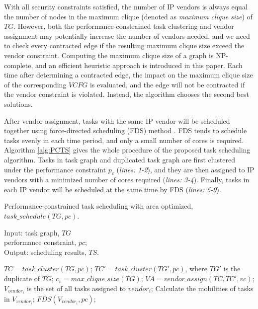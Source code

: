 \documentclass[10pt,journal]{IEEEtran}
\begin{document}
With all security constraints satisfied, the number of IP vendors is always equal the number of nodes in the maximum clique (denoted as \textit{maximum clique size}) of $TG$. However, both the performance-constrained task clustering and vendor assignment may potentially increase the number of vendors needed, and we need to check every contracted edge if the resulting maximum clique size exceed the vendor constraint. Computing the maximum clique size of a graph is NP-complete, and an efficient heuristic approach \cite{article:CL} is introduced in this paper. Each time after determining a contracted edge, the impact on the maximum clique size of the corresponding $VCFG$ is evaluated, and the edge will not be contracted if the vendor constraint is violated. Instead, the algorithm chooses the second best solutions.

After vendor assignment, tasks with the same IP vendor will be scheduled together using force-directed scheduling (FDS) method \cite{article:PP}. FDS tends to schedule tasks evenly in each time period, and only a small number of cores is required. Algorithm \ref{alg:PCTS} gives the whole procedure of the proposed task scheduling algorithm. Tasks in task graph and duplicated task graph are first clustered under the performance constraint $p_c$ (\textit{lines: 1-2}), and they are then assigned to IP vendors with a minimized number of cores required (\textit{lines: 3-4}). Finally, tasks in each IP vendor will be scheduled at the same time by FDS (\textit{lines: 5-9}).


\begin{algorithm}[!h]
\caption{Performance-constrained task scheduling with area optimized, $task\_schedule(TG, pc)$.}
\label{alg:PCTS}
{Input:} task graph, $TG$\\
\hspace*{2.8em}performance constraint, $pc$;\\
{Output:} scheduling results, $TS$.
\begin{algorithmic}[1]
\STATE $TC=task\_cluster(TG,pc)$;
\STATE $TC'=task\_cluster(TG',pc)$, where $TG'$ is the duplicate of $TG$;
\STATE $c_v=max\_clique\_size(TG)$;
\STATE $VA=vendor\_assign(TC, TC', vc)$;
    \STATE $V_{vendor_i}$ is the set of all tasks assigned to $vendor_i$;
    \STATE Calculate the mobilities of tasks in $V_{vendor_i}$;
    \STATE $FDS(V_{vendor_i}, pc)$;%
\ENDFOR
\end{algorithmic}
\end{algorithm}
\end{document}
